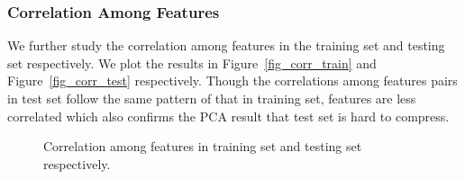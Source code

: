 \documentclass[10pt, oneside]{article}   	%
\begin{document}
%



\subsubsection{Correlation Among Features} We further study the correlation among features in the training set and testing set respectively. We plot the results in Figure~\ref{fig_corr_train} and Figure~\ref{fig_corr_test} respectively. Though the correlations among features pairs in test set follow the same pattern of that in training set, features are less correlated which also confirms the PCA result that test set is hard to compress.

\begin{figure}[!ht] %
   \centering
   \caption{Correlation among features in training set and testing set respectively.}  
\end{figure}
\end{document}
